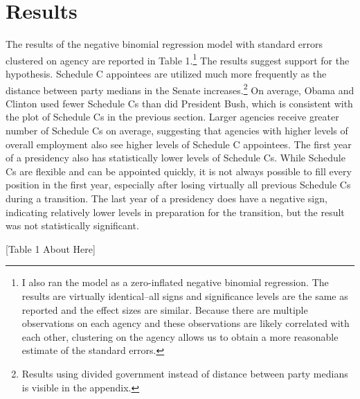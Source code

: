 \documentclass[12pt]{article}
\begin{document}
\section*{Results}
The results of the negative binomial regression model with standard errors clustered on agency are reported in Table 1.\footnote{I also ran the model as a zero-inflated negative binomial regression. The results are virtually identical--all signs and significance levels are the same as reported and the effect sizes are similar. Because there are multiple observations on each agency and these observations are likely correlated with each other, clustering on the agency allows us to obtain a more reasonable estimate of the standard errors.} The results suggest support for the hypothesis. Schedule C appointees are utilized much more frequently as the distance between party medians in the Senate increases.\footnote{Results using divided government instead of distance between party medians is visible in the appendix.} On average, Obama and Clinton used fewer Schedule Cs than did President Bush, which is consistent with the plot of Schedule Cs in the previous section. Larger agencies receive greater number of Schedule Cs on average, suggesting that agencies with higher levels of overall employment also see higher levels of Schedule C appointees. The first year of a presidency also has statistically lower levels of Schedule Cs. While Schedule Cs are flexible and can be appointed quickly, it is not always possible to fill every position in the first year, especially after losing virtually all previous Schedule Cs during a transition. The last year of a presidency does have a negative sign, indicating relatively lower levels in preparation for the transition, but the result was not statistically significant. 

\begin{center}[Table 1 About Here]\end{center}
\end{document}
